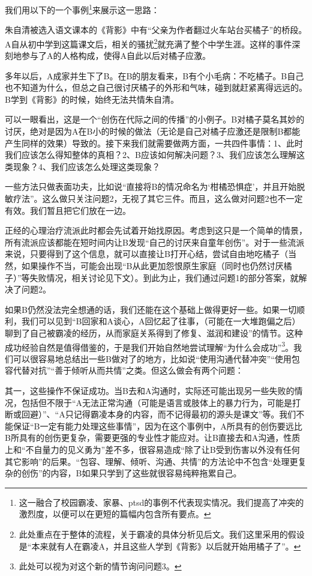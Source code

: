 \noindent 我们用以下的一个事例\footnote{这一融合了校园霸凌、家暴、ptsd的事例不代表现实情况。我们提高了冲突的激烈度，以便可以在更短的篇幅内包含所有要点。}来展示这一思路：
\begin{explain}
朱自清被选入语文课本的《背影》中有“父亲为作者翻过火车站台买橘子”的桥段。A自从初中学到这篇课文后，相关的骚扰\footnote{此处重点在于整体的流程，关于霸凌的具体分析见后文。我们这里采用的假设是“本来就有人在霸凌A，并且这些人学到《背影》以后就开始用橘子了”。}就充满了整个中学生涯。这样的事件深刻地参与了A的人格构成，使得A自此以后对橘子应激。

多年以后，A成家并生下了B。在B的朋友看来，B有个小毛病：不吃橘子。B自己也不知道为什么，但总之自己很讨厌橘子的外形和气味，碰到就赶紧离得远远的。B学到《背影》的时候，始终无法共情朱自清。
\end{explain}
\trained 可以一眼看出，这是一个“创伤在代际之间的传播”的小例子。B对橘子莫名其妙的讨厌，绝对是因为A在B小的时候的做法（无论是自己对橘子应激还是限制B都能产生同样的效果）导致的。接下来我们就需要做两方面，一共四件事情：1、此时我们应该怎么得知整体的真相？2、B应该如何解决问题？3、我们应该怎么理解这类现象？4、我们应该怎么处理这类现象？

一些方法只做表面功夫，比如说“直接将B的情况命名为‘柑橘恐惧症’，并且开始脱敏疗法”。这么做只关注问题2，无视了其它三件。而且，这么做对问题2也不一定有效。我们暂且把它们放在一边。

正经的心理治疗流派此时都会先试着开始找原因。考虑到这只是一个简单的情景，所有流派应该都能在短时间内让B发现“自己的讨厌来自童年创伤”。对于一些流派来说，只要得到了这个信息，就可以直接让B打开心结，尝试自由地吃橘子（当然，如果操作不当，可能会出现“B从此更加怨恨原生家庭（同时也仍然讨厌橘子）”等失败情况，相关讨论见下文）。到此为止，我们通过问题1的部分答案，就解决了问题2。

如果B仍然没法完全想通的话，我们还能在这个基础上做得更好一些。如果一切顺利，我们可以见到“B回家和A谈心，A回忆起了往事，（可能在一大堆跑偏之后）聊到了自己被霸凌的经历，从而家庭关系得到了修复、滋润和建设”的情节。这种成功经验自然是值得借鉴的，于是我们开始自然地尝试理解“为什么会成功”\footnote{此处可以视为对这个新的情节询问问题3。}。我们可以很容易地总结出一些B做对了的地方，比如说“使用沟通代替冲突”“使用包容代替对抗”“善于倾听从而共情”之类。但这么做会有两个问题：

其一，这些操作不保证成功。当B去和A沟通时，实际还可能出现另一些失败的情况，包括但不限于“A无法正常沟通（可能是语言或肢体上的暴力行为，可能是打断或回避）”、“A只记得霸凌本身的内容，而不记得最初的源头是课文”等。我们不能保证“B一定有能力处理这些事情”，因为在这个事例中，A所具有的创伤要远比B所具有的创伤更复杂，需要更强的专业性才能应对。让B直接去和A沟通，性质上和“不自量力的见义勇为”差不多，很容易造成“除了让B受到伤害以外没有任何其它影响”的后果。“包容、理解、倾听、沟通、共情”的方法论中不包含“处理更复杂的创伤”的内容，B如果只学到了这些就很容易纯粹拖累自己。

